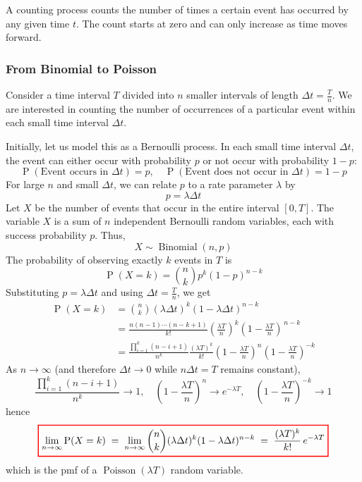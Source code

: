 \documentclass[10pt, headings=standardclasses, parskip=half, twoside]{scrartcl}
\newcommand{\Prob}{\operatorname{P}}
\begin{document}
A counting process counts the number of times a certain event has occurred by any given time \(t\). 
The count starts at zero and can only increase as time moves forward.


\subsubsection{From Binomial to Poisson}

Consider a time interval \(T\) divided into \(n\) smaller intervals of length \(\Delta t = \frac{T}{n}\).
We are interested in counting the number of occurrences of a particular event within each small time interval \(\Delta t\).

Initially, let us model this as a Bernoulli process. 
In each small time interval $\Delta t$, the event can either occur with probability $p$ or not occur with probability $1-p$:
$$
\Prob(\text{Event occurs in } \Delta t)=p, \quad \Prob(\text{Event does not occur in } \Delta t)=1-p
$$
For large $n$ and small $\Delta t$, we can relate $p$ to a rate parameter $\lambda$ by
$$
p=\lambda \Delta t
$$
Let $X$ be the number of events that occur in the entire interval $[0, T]$. 
The variable $X$ is a sum of $n$ independent Bernoulli random variables, each with success probability $p$. 
Thus,
$$
X \sim \operatorname{Binomial}(n, p)
$$
The probability of observing exactly $k$ events in $T$ is
$$
\Prob(X=k)=\binom{n}{k} p^k(1-p)^{n-k}
$$
Substituting $p=\lambda \Delta t$ and using \(\Delta t = \frac{T}{n}\), we get
\[
\begin{aligned}
\Prob(X = k) &= \binom{n}{k}(\lambda\Delta t)^k(1-\lambda\Delta t)^{n-k}\\
            &= \frac{n(n-1)\cdots(n-k+1)}{k!}
               \left(\frac{\lambda T}{n}\right)^k
               \left(1-\frac{\lambda T}{n}\right)^{\,n-k}\\
            &= \frac{\prod_{i=1}^k (n-i+1)}{n^k}
                \frac{(\lambda T)^k}{k!}
                \left(1-\frac{\lambda T}{n}\right)^{n}
                \left(1-\frac{\lambda T}{n}\right)^{-k}
\end{aligned}
\]
As $n \rightarrow \infty$ (and therefore $\Delta t \rightarrow 0$ while $n \Delta t=T$ remains constant),%
\[
\frac{\prod_{i=1}^k (n-i+1)}{n^k} \longrightarrow 1,
\quad
\left(1-\frac{\lambda T}{n}\right)^{n}\longrightarrow e^{-\lambda T},
\quad
\left(1-\frac{\lambda T}{n}\right)^{-k} \longrightarrow 1
\]
hence
\[
  {\color{red}
  \setlength{\fboxrule}{1pt}
  \boxed{ 
  \color{black}
\lim_{n\to\infty}\Prob(X=k)
\;=\;
\lim_{n\to\infty}
  \binom{n}{k}(\lambda\Delta t)^k(1-\lambda\Delta t)^{n-k}
\;=\;
\frac{(\lambda T)^k}{k!}\,e^{-\lambda T}
  }
  }
\]
which is the \gls{pmf} of a \(\operatorname{Poisson}(\lambda T)\) random variable. \qedhere
\end{document}
